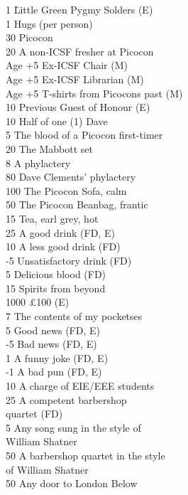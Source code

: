 \begin{multicols}{2}
	\begin{tabbing}
1 \hspace{12mm}	\= Little Green Pygmy Solders (E) \\
1	\> Hugs (per person) \\
30	\> Picocon \\
20	\> A non-ICSF fresher at Picocon \\
Age +5	\> Ex-ICSF Chair (M) \\
Age +5	\> Ex-ICSF Librarian (M) \\
Age +5	\> T-shirts from Picocons past (M) \\
10 	\> Previous Guest of Honour (E) \\
10	\> Half of one (1) Dave \\
5	\> The blood of a Picocon first-timer \\
20	\> The Mabbott set \\
8	\> A phylactery \\
80 	\> Dave Clements' phylactery \\
100	\> The Picocon Sofa, calm \\
50	\> The Picocon Beanbag, frantic \\
15	\> Tea, earl grey, hot \\
25 	\> A good drink (FD, E) \\
10 	\> A less good drink (FD) \\
-5	\> Unsatisfactory drink (FD) \\
5	\> Delicious blood (FD) \\
15	\> Spirits from beyond \\
1000 	\> £100 (E) \\
7	\> The contents of my pocketses \\
5	\> Good news (FD, E) \\
-5	\> Bad news (FD, E) \\
1	\> A funny joke (FD, E) \\
-1	\> A bad pun (FD, E) \\
10	\> A charge of EIE/EEE students \\
25	\> A competent barbershop \\ \> quartet (FD) \\
5	\> Any song sung in the style of \\ \> William Shatner \\
50	\> A barbershop quartet in the style \\ \> of William Shatner \\
50 \> Any door to London Below \\

\end{tabbing}
\end{multicols}
